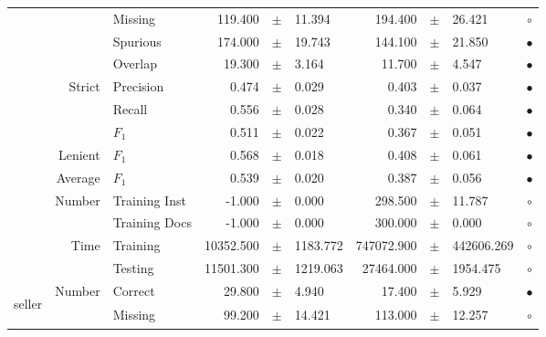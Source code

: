 \begin{longtable}{|r|r|l||rcl|rcl|c|}
&                             &         Missing &     119.400 &  $\pm$  &      11.394 &     194.400 &  $\pm$  &      26.421 & $\circ$ \\
&                             &        Spurious &     174.000 &  $\pm$  &      19.743 &     144.100 &  $\pm$  &      21.850 & $\bullet$ \\
&                             &         Overlap &      19.300 &  $\pm$  &       3.164 &      11.700 &  $\pm$  &       4.547 & $\bullet$ \\
& \multirow{3}{*}{    Strict} &       Precision &       0.474 &  $\pm$  &       0.029 &       0.403 &  $\pm$  &       0.037 & $\bullet$ \\
&                             &          Recall &       0.556 &  $\pm$  &       0.028 &       0.340 &  $\pm$  &       0.064 & $\bullet$ \\
&                             &           $F_1$ &       0.511 &  $\pm$  &       0.022 &       0.367 &  $\pm$  &       0.051 & $\bullet$ \\
&                     Lenient &           $F_1$ &       0.568 &  $\pm$  &       0.018 &       0.408 &  $\pm$  &       0.061 & $\bullet$ \\
&                     Average &           $F_1$ &       0.539 &  $\pm$  &       0.020 &       0.387 &  $\pm$  &       0.056 & $\bullet$ \\
& \multirow{2}{*}{    Number} &   Training Inst &      -1.000 &  $\pm$  &       0.000 &     298.500 &  $\pm$  &      11.787 & $\circ$ \\
&                             &   Training Docs &      -1.000 &  $\pm$  &       0.000 &     300.000 &  $\pm$  &       0.000 & $\circ$ \\
& \multirow{2}{*}{      Time} &        Training &   10352.500 &  $\pm$  &    1183.772 &  747072.900 &  $\pm$  &  442606.269 & $\circ$ \\
&                             &         Testing &   11501.300 &  $\pm$  &    1219.063 &   27464.000 &  $\pm$  &    1954.475 & $\circ$ \\
\hline
\hline
\multirow{11}{*}{\begin{sideways}seller\end{sideways} }
& \multirow{4}{*}{    Number} &         Correct &      29.800 &  $\pm$  &       4.940 &      17.400 &  $\pm$  &       5.929 & $\bullet$ \\
&                             &         Missing &      99.200 &  $\pm$  &      14.421 &     113.000 &  $\pm$  &      12.257 & $\circ$ \\

\end{longtable}
